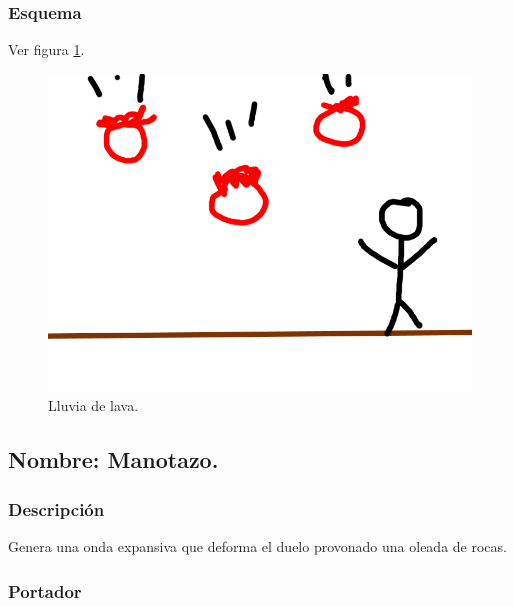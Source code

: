 \documentclass[11pt,letterpaper]{article}
\begin{document}
\subsubsection{Esquema}	
			Ver figura \ref{fig:lluviaL}.
			\begin{figure}
				\centering
				\includegraphics[height=0.2 \textheight]{Imagenes/lluviaL}
				\caption{Lluvia de lava.}
				\label{fig:lluviaL}
			\end{figure}
\subsection{Nombre: Manotazo.}
\subsubsection{Descripción}
Genera una onda expansiva que deforma el duelo provonado una oleada de rocas.
\subsubsection{Portador}
\end{document}
